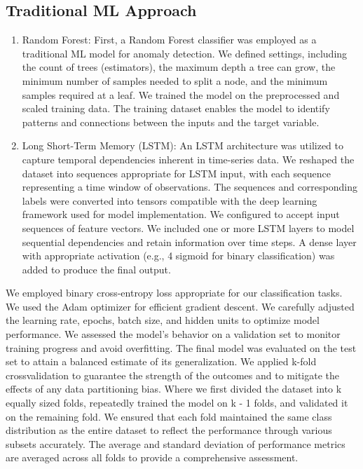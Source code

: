 \subsection{Traditional ML Approach}\label{subsec:ch2/sec3/sub2}
\begin{enumerate}
    \item Random Forest: First, a Random Forest \autocite{biau2015randomforestguidedtour} classifier was employed as a traditional ML model for anomaly detection. We defined settings, including the count of trees (estimators), the maximum depth a tree can grow, the minimum number of samples needed to split a node, and the minimum samples required at a leaf. We trained the model on the preprocessed and scaled training data. The training dataset enables the model to identify patterns and connections between the inputs and the target variable.

    \item Long Short-Term Memory (LSTM): An LSTM \autocite{Hochreiter_1997} architecture was utilized to capture temporal dependencies inherent in time-series data. We reshaped the dataset into sequences appropriate for LSTM input, with each sequence representing a time window of observations. The sequences and corresponding labels were converted into tensors compatible with the deep learning framework used for model implementation. We configured to accept input sequences of feature vectors. We included one or more LSTM layers to model sequential dependencies and retain information over time steps. A dense layer with appropriate activation (e.g., 4  sigmoid for binary classification) was added to produce the final output.
\end{enumerate}

We employed binary cross-entropy loss appropriate for our classification tasks. We used the Adam optimizer for efficient gradient descent. We carefully adjusted the learning rate, epochs, batch size, and hidden units to optimize model performance.  We assessed the model’s behavior on a validation set to monitor training progress and avoid overfitting. The final model was evaluated on the test set to attain a balanced estimate of its generalization. We applied k-fold crossvalidation to guarantee the strength of the outcomes and to mitigate the effects of any data partitioning bias. Where we first divided the dataset into k equally sized folds, repeatedly trained the model on k - 1 folds, and validated it on the remaining fold. We ensured that each fold maintained the same class distribution as the entire dataset to reflect the performance through various subsets accurately. The average and standard deviation of performance metrics are averaged across all folds to provide a comprehensive assessment.


